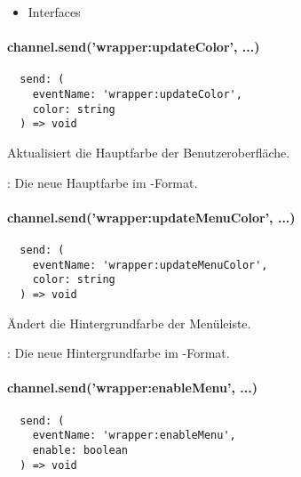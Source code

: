 \begin{itemize}
  \setlength\itemsep{-0.8em}
  \item Interfaces
\end{itemize}


\paragraph{channel.send('wrapper:updateColor', ...)}

\begin{verbatim}
  send: (
    eventName: 'wrapper:updateColor',
    color: string
  ) => void
\end{verbatim}

Aktualisiert die Hauptfarbe der Benutzeroberfläche.

\begin{arguments}
  \item {}: Die neue Hauptfarbe im -Format.
\end{arguments}


\newpage

\paragraph{channel.send('wrapper:updateMenuColor', ...)}

\begin{verbatim}
  send: (
    eventName: 'wrapper:updateMenuColor',
    color: string
  ) => void
\end{verbatim}

Ändert die Hintergrundfarbe der Menüleiste.

\begin{arguments}
  \item {}: Die neue Hintergrundfarbe im -Format.
\end{arguments}


\paragraph{channel.send('wrapper:enableMenu', ...)}

\begin{verbatim}
  send: (
    eventName: 'wrapper:enableMenu',
    enable: boolean
  ) => void
\end{verbatim}


